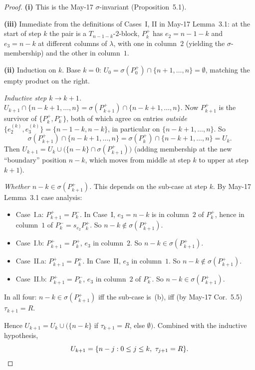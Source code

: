 \documentclass[11pt]{article}
\theoremstyle{definition}
\begin{document}
\begin{proof}
\textbf{(i)}  This is the May-17 $\sigma$-invariant (Proposition~5.1).

\medskip\noindent\textbf{(iii)}  Immediate from the definitions of
Cases~I, II in May-17 Lemma~3.1: at the start of step $k$ the pair is
a $T_{n-1-k}$-$2$-block, $P_k^+$ has $e_2=n-1-k$ and $e_3=n-k$ at
different columns of $\lambda$, with one in column~$2$ (yielding the
$\sigma$-membership) and the other in column~$1$.

\medskip\noindent\textbf{(ii)}  Induction on $k$.  Base $k=0$:
$U_0=\sigma(P_0^+)\cap\{n+1,\ldots,n\}=\emptyset$, matching the
empty product on the right.

\emph{Inductive step $k\to k+1$.}  $U_{k+1}\cap\{n-k+1,\ldots,n\}
=\sigma(P_{k+1}^+)\cap\{n-k+1,\ldots,n\}$.  Now $P_{k+1}^+$ is the
survivor of $\{P_k^+,P_k^-\}$, both of which agree on entries
\emph{outside} $\{e_2^{(k)},e_3^{(k)}\}=\{n-1-k,n-k\}$, in particular
on $\{n-k+1,\ldots,n\}$.  So
\[
   \sigma(P_{k+1}^+)\cap\{n-k+1,\ldots,n\}
   =\sigma(P_k^+)\cap\{n-k+1,\ldots,n\}
   =U_k.
\]
Then $U_{k+1}=U_k\cup\big(\{n-k\}\cap\sigma(P_{k+1}^+)\big)$
(adding membership at the new ``boundary'' position $n-k$, which
moves from middle at step $k$ to upper at step $k+1$).

\emph{Whether $n-k\in\sigma(P_{k+1}^+)$.}  This depends on the
sub-case at step $k$.  By May-17 Lemma~3.1 case analysis:
\begin{itemize}[leftmargin=2em,topsep=0.3em,itemsep=0.2em]
\item Case~I.a: $P_{k+1}^+=P_k^-$.  In Case~I, $e_3=n-k$ is in
column~$2$ of $P_k^+$, hence in column~$1$ of $P_k^-=s_{e_2}P_k^+$.
So $n-k\notin\sigma(P_{k+1}^+)$.
\item Case~I.b: $P_{k+1}^+=P_k^+$, $e_3$ in column~$2$.  So
$n-k\in\sigma(P_{k+1}^+)$.
\item Case~II.a: $P_{k+1}^+=P_k^+$.  In Case~II, $e_3$ in column~$1$.
So $n-k\notin\sigma(P_{k+1}^+)$.
\item Case~II.b: $P_{k+1}^+=P_k^-$, $e_3$ in column~$2$ of $P_k^-$.
So $n-k\in\sigma(P_{k+1}^+)$.
\end{itemize}
In all four: $n-k\in\sigma(P_{k+1}^+)$ iff the sub-case is~(b),
iff (by May-17 Cor.~5.5) $\tau_{k+1}=R$.

\medskip
Hence $U_{k+1}=U_k\cup(\{n-k\}$ if $\tau_{k+1}=R$, else $\emptyset)$.
Combined with the inductive hypothesis,
\[
   U_{k+1}=\{n-j : 0\le j\le k,\ \tau_{j+1}=R\}.
   \qedhere
\]
\end{proof}
\end{document}
